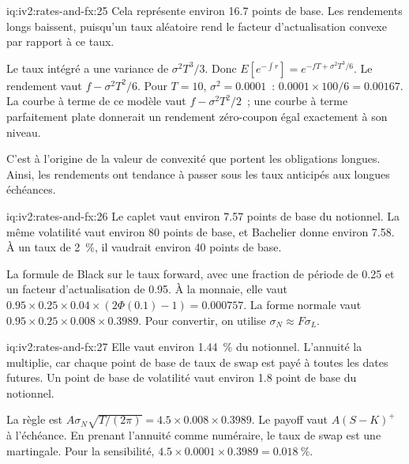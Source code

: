 \begin{solution}{iq:iv2:rates-and-fx:25}
Cela représente environ 16.7 points de base. Les rendements longs baissent, puisqu'un taux aléatoire rend le facteur d'actualisation convexe par rapport à ce taux.

Le taux intégré a une variance de $\sigma^2T^3/3$. Donc $E[e^{-\int r}] = e^{-f T + \sigma^2T^3/6}$. Le rendement vaut $f - \sigma^2T^2/6$. Pour $T = 10$, $\sigma^2 = 0.0001$~: $0.0001 \times 100/6 = 0.00167$. La courbe à terme de ce modèle vaut $f - \sigma^2T^2/2$~; une courbe à terme parfaitement plate donnerait un rendement zéro-coupon égal exactement à son niveau.

C'est à l'origine de la valeur de convexité que portent les obligations longues. Ainsi, les rendements ont tendance à passer sous les taux anticipés aux longues échéances.

\end{solution}

\begin{solution}{iq:iv2:rates-and-fx:26}
Le caplet vaut environ 7.57 points de base du notionnel. La même volatilité vaut environ 80 points de base, et Bachelier donne environ 7.58. À un taux de 2~\%, il vaudrait environ 40 points de base.

La formule de Black sur le taux forward, avec une fraction de période de 0.25 et un facteur d'actualisation de 0.95. À la monnaie, elle vaut $0.95 \times 0.25 \times 0.04 \times (2\Phi(0.1) - 1) = 0.000757$. La forme normale vaut $0.95 \times 0.25 \times 0.008 \times 0.3989$. Pour convertir, on utilise $\sigma_N \approx F\sigma_L$.

\end{solution}

\begin{solution}{iq:iv2:rates-and-fx:27}
Elle vaut environ 1.44~\% du notionnel. L'annuité la multiplie, car chaque point de base de taux de swap est payé à toutes les dates futures. Un point de base de volatilité vaut environ 1.8 point de base du notionnel.

La règle est $A\sigma_N\sqrt{T/(2\pi)} = 4.5 \times 0.008 \times 0.3989$. Le payoff vaut $A(S - K)^+$ à l'échéance. En prenant l'annuité comme numéraire, le taux de swap est une martingale. Pour la sensibilité, $4.5 \times 0.0001 \times 0.3989 = 0.018~\%$.

\end{solution}

